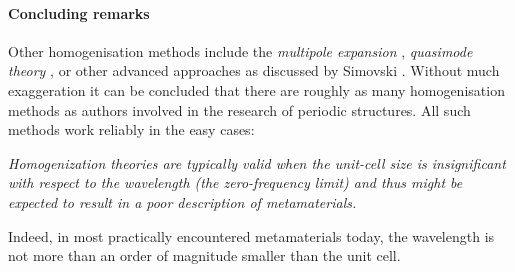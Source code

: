 




\paragraph{Concluding remarks}
Other homogenisation methods include the \textit{multipole expansion} \cite{vynck2009all, chipouline2012metamaterials, petschulat2008multipole}, \textit{quasimode theory} \cite{sun2009effective}, or other advanced approaches as discussed by Simovski \cite{simovski2007bloch, simovski2009material, simovski2011electromagnetic, tsukerman2011nonlocal}.
Without much exaggeration it can be concluded that there are roughly as many homogenisation methods as authors involved in the research of periodic structures. All such methods work reliably in the easy cases:
\begin{displayquote}
\textit{Homogenization theories are typically valid when the unit-cell size is insignificant with respect to the wavelength (the zero-frequency limit) and thus might be expected to result in a poor description of metamaterials.}
\cite{smith2006homogenization} 
\end{displayquote}
Indeed, in most practically encountered metamaterials today, the wavelength is not more than an order of magnitude smaller than the unit cell. %

